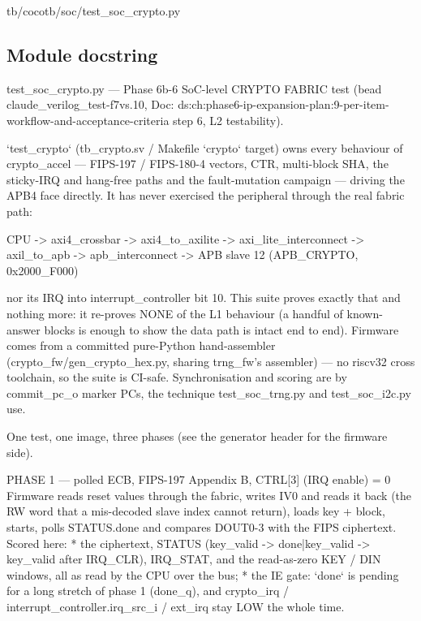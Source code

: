 \begin{relocated}{tb/cocotb/soc/test_soc_crypto.py}

\subsection*{Module docstring}

\begin{textblock}
test_soc_crypto.py — Phase 6b-6 SoC-level CRYPTO FABRIC test (bead claude_verilog_test-f7vs.10,
Doc: ds:ch:phase6-ip-expansion-plan:9-per-item-workflow-and-acceptance-criteria step 6, L2 testability).

`test_crypto` (tb_crypto.sv / Makefile `crypto` target) owns every behaviour of crypto_accel —
FIPS-197 / FIPS-180-4 vectors, CTR, multi-block SHA, the sticky-IRQ and hang-free paths and the
fault-mutation campaign — driving the APB4 face directly. It has never exercised the peripheral
through the real fabric path:

CPU -> axi4_crossbar -> axi4_to_axilite -> axi_lite_interconnect ->
axil_to_apb -> apb_interconnect -> APB slave 12 (APB_CRYPTO, 0x2000_F000)

nor its IRQ into interrupt_controller bit 10. This suite proves exactly that and nothing more: it
re-proves NONE of the L1 behaviour (a handful of known-answer blocks is enough to show the data path
is intact end to end). Firmware comes from a committed pure-Python hand-assembler
(crypto_fw/gen_crypto_hex.py, sharing trng_fw's assembler) — no riscv32 cross toolchain, so the
suite is CI-safe. Synchronisation and scoring are by commit_pc_o marker PCs, the technique
test_soc_trng.py and test_soc_i2c.py use.

One test, one image, three phases (see the generator header for the firmware side).

PHASE 1 — polled ECB, FIPS-197 Appendix B, CTRL[3] (IRQ enable) = 0
Firmware reads reset values through the fabric, writes IV0 and reads it back (the RW word that a
mis-decoded slave index cannot return), loads key + block, starts, polls STATUS.done and compares
DOUT0-3 with the FIPS ciphertext. Scored here:
* the ciphertext, STATUS (key_valid -> done|key_valid -> key_valid after IRQ_CLR), IRQ_STAT, and
the read-as-zero KEY / DIN windows, all as read by the CPU over the bus;
* the IE gate: `done` is pending for a long stretch of phase 1 (done_q), and crypto_irq /
interrupt_controller.irq_src_i / ext_irq stay LOW the whole time.


\end{textblock}
\end{relocated}
